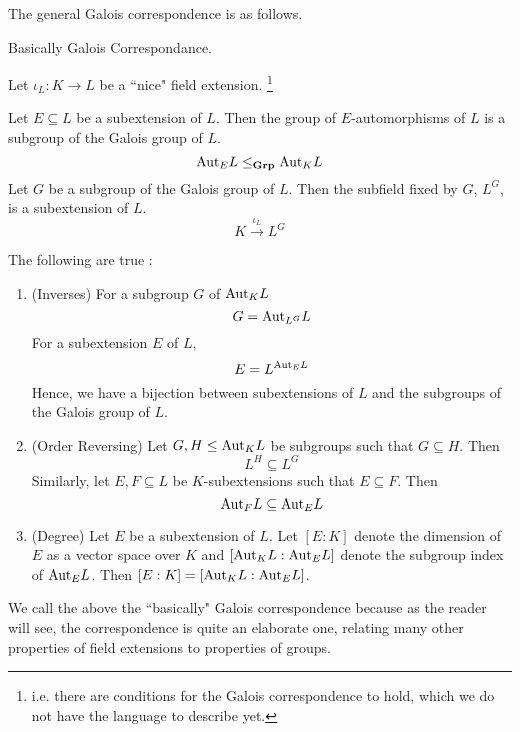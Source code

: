 \documentclass[../book.tex]{subfiles}
\begin{document}
The general Galois correspondence is as follows. 
\begin{thm} Basically Galois Correspondance. 
    
    Let $\iota_L : K \to L$ be a ``nice" field extension.
    \footnote{
        i.e. there are conditions for the Galois correspondence to hold,
        which we do not have the language to describe yet.
    }
    
    Let $E \subseteq L$ be a subextension of $L$. 
    Then the group of $E$-automorphisms of $L$ is
    a subgroup of the Galois group of $L$. \[
        \mathrm{Aut}_{E}L \leq_{\mathbf{Grp}} \mathrm{Aut}_{K}L
    \]
    Let $G$ be a subgroup of the Galois group of $L$. 
    Then the subfield fixed by $G$, $L^G$, is a subextension of $L$.
    \[ K \overset{\iota_L}{\to} L^G \]
    
    The following are true :  
    \begin{enumerate}
        \item (Inverses)
            For a subgroup $G$ of $\mathrm{Aut}_{K}L$ \[
                G = \mathrm{Aut}_{L^G}L
            \]
            For a subextension $E$ of $L$, \[
                E = L^{\mathrm{Aut}_{E}L}
            \]
            Hence, we have a bijection between subextensions of $L$
            and the subgroups of the Galois group of $L$.
            
            \begin{figure} [H]
                \centering
            \end{figure}
            
            \item (Order Reversing) 
            Let $G, H \leq \mathrm{Aut}_{K}L$ be subgroups such that $G \subseteq H$.
            Then \[ L^H \subseteq L^G \]
            Similarly, 
            let $E, F \subseteq L$ be $K$-subextensions such that $E \subseteq F$.
            Then \[ \mathrm{Aut}_{F}L \subseteq \mathrm{Aut}_{E}L \]
        \item (Degree) 
            Let $E$ be a subextension of $L$. 
            Let $[E : K]$ denote the dimension of $E$ as a vector space over $K$
            and $[\mathrm{Aut}_{K}L : \mathrm{Aut}_{E}L]$ denote the subgroup index of $\mathrm{Aut}_{E}L$.
            Then $[E : K] = [\mathrm{Aut}_{K}L : \mathrm{Aut}_{E}L]$. 
    \end{enumerate}
\end{thm}
We call the above the ``basically" Galois correspondence because
as the reader will see, the correspondence is quite an elaborate one,
relating many other properties of field extensions to properties of groups. 
\end{document}

